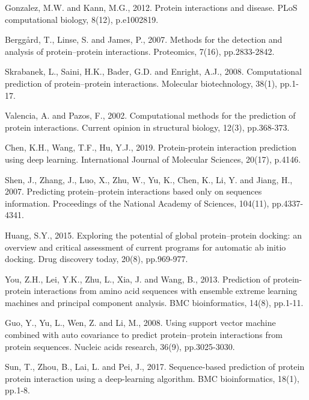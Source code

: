 \documentclass[12pt,a4paper]{article}
\begin{document}

\begin{thebibliography}{00}

 Gonzalez, M.W. and Kann, M.G., 2012. Protein interactions and disease. PLoS computational biology, 8(12), p.e1002819.

 Berggård, T., Linse, S. and James, P., 2007. Methods for the detection and analysis of protein–protein interactions. Proteomics, 7(16), pp.2833-2842.

 Skrabanek, L., Saini, H.K., Bader, G.D. and Enright, A.J., 2008. Computational prediction of protein–protein interactions. Molecular biotechnology, 38(1), pp.1-17.

 Valencia, A. and Pazos, F., 2002. Computational methods for the prediction of protein interactions. Current opinion in structural biology, 12(3), pp.368-373.

 Chen, K.H., Wang, T.F., Hu, Y.J., 2019. Protein-protein interaction prediction using deep learning. International Journal of Molecular Sciences, 20(17), p.4146.

 Shen, J., Zhang, J., Luo, X., Zhu, W., Yu, K., Chen, K., Li, Y. and Jiang, H., 2007. Predicting protein–protein interactions based only on sequences information. Proceedings of the National Academy of Sciences, 104(11), pp.4337-4341.

 Huang, S.Y., 2015. Exploring the potential of global protein–protein docking: an overview and critical assessment of current programs for automatic ab initio docking. Drug discovery today, 20(8), pp.969-977.

 You, Z.H., Lei, Y.K., Zhu, L., Xia, J. and Wang, B., 2013. Prediction of protein-protein interactions from amino acid sequences with ensemble extreme learning machines and principal component analysis. BMC bioinformatics, 14(8), pp.1-11.

 Guo, Y., Yu, L., Wen, Z. and Li, M., 2008. Using support vector machine combined with auto covariance to predict protein–protein interactions from protein sequences. Nucleic acids research, 36(9), pp.3025-3030.

 Sun, T., Zhou, B., Lai, L. and Pei, J., 2017. Sequence-based prediction of protein protein interaction using a deep-learning algorithm. BMC bioinformatics, 18(1), pp.1-8.


\end{thebibliography}
\end{document}
